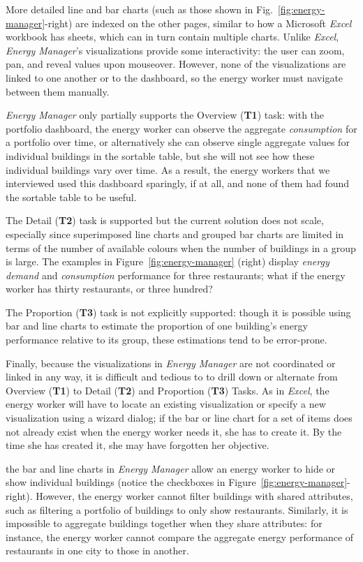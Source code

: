 \documentclass[journal]{vgtc}                %
\newcommand{\bstart}[1]{\vspace{1mm} \noindent{\textbf{#1:}}}
\begin{document}
More detailed line and bar charts (such as those shown in Fig.~\ref{fig:energy-manager}-right) are indexed on the other pages, similar to how a Microsoft {\it Excel} workbook has sheets, which can in turn contain multiple charts. Unlike {\it Excel}, {\it Energy Manager}'s visualizations provide some interactivity: the user can zoom, pan, and reveal values upon mouseover. 
However, none of the visualizations are linked to one another or to the dashboard, so the energy worker must navigate between them manually.

\bstart{Task support} {\it Energy Manager} only partially supports the Overview ({\bf T1}) task: with the portfolio dashboard, the energy worker can observe the aggregate {\it consumption} for a portfolio over time, or alternatively she can observe single aggregate values for individual buildings in the sortable table, but she will not see how these individual buildings vary over time.
As a result, the energy workers that we interviewed used this dashboard sparingly, if at all, and none of them had found the sortable table to be useful.

The Detail ({\bf T2}) task is supported but the current solution does not scale, especially since superimposed line charts and grouped bar charts are limited in terms of the number of available colours when the number of buildings in a group is large.
The examples in Figure~\ref{fig:energy-manager} (right) display {\it energy demand} and {\it consumption} performance for three restaurants; what if the energy worker has thirty restaurants, or three hundred?

The Proportion ({\bf T3}) task is not explicitly supported: though it is possible using bar and line charts to estimate the proportion of one building's energy performance relative to its group, these estimations tend to be error-prone.

Finally, because the visualizations in {\it Energy Manager} are not coordinated or linked in any way, it is difficult and tedious to to drill down or alternate from Overview ({\bf T1}) to Detail ({\bf T2}) and Proportion ({\bf T3}) Tasks. 
As in {\it Excel}, the energy worker will have to locate an existing visualization or specify a new visualization using a wizard dialog; if the bar or line chart for a set of items does not already exist when the energy worker needs it, she has to create it. 
By the time she has created it, she may have forgotten her objective.

\bstart{Limited filtering and aggregation} the bar and line charts in {\it Energy Manager} allow an energy worker to hide or show individual buildings (notice the checkboxes in Figure~\ref{fig:energy-manager}-right).
However, the energy worker cannot filter buildings with shared attributes, such as filtering a portfolio of buildings to only show restaurants.
Similarly, it is impossible to aggregate buildings together when they share attributes: for instance, the energy worker cannot compare the aggregate energy performance of restaurants in one city to those in another.
\end{document}
